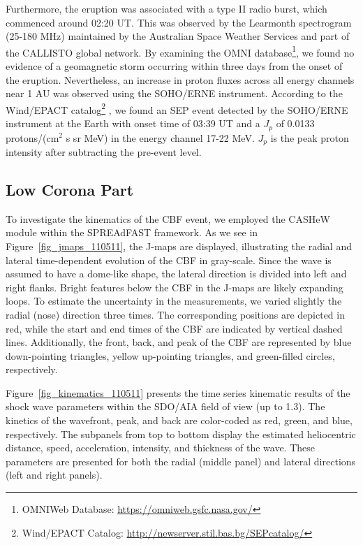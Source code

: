 Furthermore, the eruption was associated with a type II radio burst, which commenced around 02:20 UT. This was observed by the Learmonth spectrogram (25-180 MHz) maintained by the Australian Space Weather Services and part of the CALLISTO global network. By examining the OMNI database\footnote{OMNIWeb Database: \url{https://omniweb.gsfc.nasa.gov/}}, we found no evidence of a geomagnetic storm occurring within three days from the onset of the eruption. Nevertheless, an increase in proton fluxes across all energy channels near 1 AU was observed using the SOHO/ERNE instrument. According to the Wind/EPACT catalog\footnote{Wind/EPACT Catalog: \url{http://newserver.stil.bas.bg/SEPcatalog/}} \citep{miteva_2016, miteva_2017}, we found an SEP event detected by the SOHO/ERNE instrument at the Earth with onset time of 03:39 UT and a $J_p$ of 0.0133 protons/(cm$^2$ s sr MeV) in the energy channel 17-22 MeV. $J_p$ is the peak proton intensity after subtracting the pre-event level.

\subsection{Low Corona Part}
To investigate the kinematics of the CBF event, we employed the CASHeW module within the SPREAdFAST framework. As we see in Figure~\ref{fig_jmaps_110511}, the J-maps are displayed, illustrating the radial and lateral time-dependent evolution of the CBF in gray-scale. Since the wave is assumed to have a dome-like shape, the lateral direction is divided into left and right flanks. Bright features below the CBF in the J-maps are likely expanding loops. To estimate the uncertainty in the measurements, we varied slightly the radial (nose) direction three times. The corresponding positions are depicted in red, while the start and end times of the CBF are indicated by vertical dashed lines. Additionally, the front, back, and peak of the CBF are represented by blue down-pointing triangles, yellow up-pointing triangles, and green-filled circles, respectively.

Figure~\ref{fig_kinematics_110511} presents the time series kinematic results of the shock wave parameters within the SDO/AIA field of view (up to 1.3\rsun). The kinetics of the wavefront, peak, and back are color-coded as red, green, and blue, respectively. The subpanels from top to bottom display the estimated heliocentric distance, speed, acceleration, intensity, and thickness of the wave. These parameters are presented for both the radial (middle panel) and lateral directions (left and right panels).


